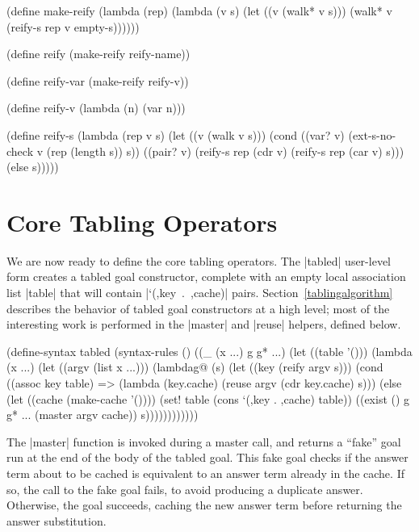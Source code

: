 \schemedisplayspace
\begin{schemedisplay} 
(define make-reify
  (lambda (rep)
    (lambda (v s)
      (let ((v (walk* v s)))
        (walk* v (reify-s rep v empty-s))))))

(define reify (make-reify reify-name))

(define reify-var (make-reify reify-v))

(define reify-v
  (lambda (n)
    (var n)))

(define reify-s
  (lambda (rep v s)
    (let ((v (walk v s)))
      (cond
        ((var? v) (ext-s-no-check v (rep (length s)) s))
        ((pair? v) (reify-s rep (cdr v) (reify-s rep (car v) s)))
        (else s)))))
\end{schemedisplay}


\section{Core Tabling Operators}\label{tablingmainimpl}

We are now ready to define the core tabling operators.  The \scheme|tabled|
user-level form creates a tabled goal constructor, complete with an empty local
association list \scheme|table| that will contain \mbox{\scheme|`(,key . ,cache)|} pairs.
Section~\ref{tablingalgorithm} describes the behavior of tabled goal constructors
at a high level; most of the interesting work is performed in the
\scheme|master| and \scheme|reuse| helpers, defined below.

\schemedisplayspace
\begin{schemedisplay}
(define-syntax tabled
  (syntax-rules ()
    ((_ (x ...) g g* ...)
     (let ((table '()))
       (lambda (x ...)
         (let ((argv (list x ...)))
           (lambdag@ (s)
             (let ((key (reify argv s)))
               (cond
                 ((assoc key table)
                  => (lambda (key.cache) (reuse argv (cdr key.cache) s)))
                 (else (let ((cache (make-cache '())))
                         (set! table (cons `(,key . ,cache) table))
                         ((exist () g g* ... (master argv cache)) s))))))))))))
\end{schemedisplay}

The \scheme|master| function is invoked during a master call, and
returns a ``fake'' goal run at the end of the body of the tabled
goal. This fake goal checks if the answer term about to be cached is
equivalent to an answer term already in the cache.  If so, the call to
the fake goal fails, to avoid producing a duplicate answer.
Otherwise, the goal succeeds, caching the new answer term
before returning the answer substitution.

